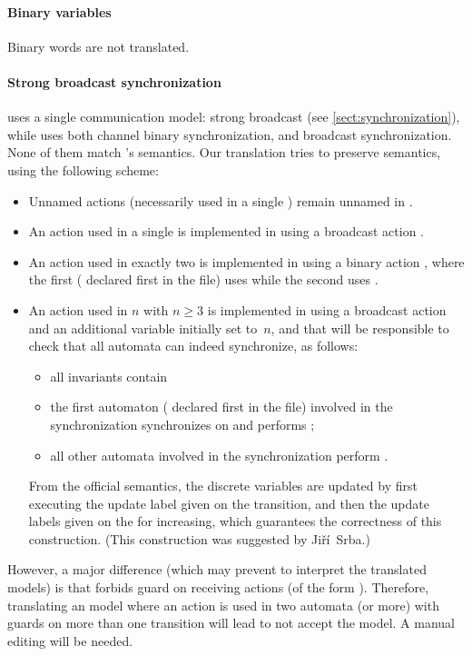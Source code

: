 \paragraph{Binary variables}
Binary words are not translated.


\paragraph{Strong broadcast synchronization}
\imitator{} uses a single communication model: strong broadcast (see \cref{sect:synchronization}), while \uppaal{} uses both channel binary synchronization, and broadcast synchronization.
None of them match \imitator{}'s semantics.
Our translation tries to preserve \imitator{} semantics, using the following scheme:
\begin{itemize}
	\item Unnamed actions (necessarily used in a single \IPTA{}) remain unnamed in \uppaal{}.
	\item An action  used in a single \IPTA{} is implemented in \uppaal{} using a broadcast action .
	\item An action  used in exactly two \IPTA{} is implemented in \uppaal{} using a binary action , where the first (\ie{} declared first in the \imitator{} file) uses  while the second uses .
	\item An action  used in $n$ \IPTA{} with $n \geq 3$ is implemented in \uppaal{} using a broadcast action  and an additional variable  initially set to~$n$, and that will be responsible to check that all automata can indeed synchronize, as follows:
	      \begin{itemize}
		      \item all invariants contain 
		      \item the first automaton (\ie{} declared first in the \imitator{} file) involved in the synchronization synchronizes on  and performs ;
		      \item all other automata involved in the synchronization perform .
	      \end{itemize}
	      From the \uppaal{} official semantics, the discrete variables are updated by first executing the update label given on the  transition, and then the update labels given on the  for increasing, which guarantees the correctness of this construction.
	      (This construction was suggested by Jiří~Srba.)
\end{itemize}
However, a major difference (which may prevent \uppaal{} to interpret the translated models) is that \uppaal{} forbids guard on receiving actions (of the form ).
Therefore, translating an \imitator{} model where an action  is used in two automata (or more) with guards on more than one transition will lead \uppaal{} to not accept the model.
A manual editing will be needed.

